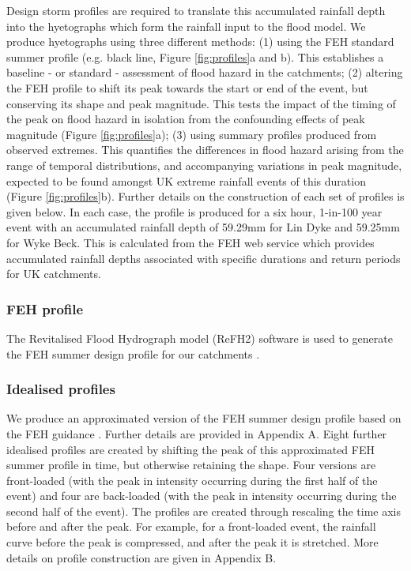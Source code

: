 \documentclass[APA,Times2COL]{WileyNJDv5}
\begin{document}
Design storm profiles are required to translate this accumulated rainfall depth into the hyetographs which form the rainfall input to the flood model. We produce hyetographs using three different methods: (1) using the FEH standard summer profile (e.g. black line, Figure \ref{fig:profiles}a and b). This establishes a baseline - or standard - assessment of flood hazard in the catchments; (2) altering the FEH profile to shift its peak towards the start or end of the event, but conserving its shape and peak magnitude. This tests the impact of the timing of the peak on flood hazard in isolation from the confounding effects of peak magnitude (Figure \ref{fig:profiles}a); (3) using summary profiles produced from observed extremes. This quantifies the differences in flood hazard arising from the range of temporal distributions, and accompanying variations in peak magnitude, expected to be found amongst UK extreme rainfall events of this duration (Figure \ref{fig:profiles}b). Further details on the construction of each set of profiles is given below. In each case, the profile is produced for a six hour, 1-in-100 year event with an accumulated rainfall depth of 59.29mm for Lin Dyke and 59.25mm for Wyke Beck. This is calculated from the FEH web service which provides accumulated rainfall depths associated with specific durations and return periods for UK catchments.

\subsubsection{FEH profile}\label{subsubsec:feh}
The Revitalised Flood Hydrograph model (ReFH2) software is used to generate the FEH summer design profile for our catchments \citep{kjeldsen2013modelling}.

\subsubsection{Idealised profiles}\label{subsubsec:idealised}
We produce an approximated version of the FEH summer design profile based on the FEH guidance \citep{kjeldsen2007revitalised}. Further details are provided in Appendix A. Eight further idealised profiles are created by shifting the peak of this approximated FEH summer profile in time, but otherwise retaining the shape. Four versions are front-loaded (with the peak in intensity occurring during the first half of the event) and four are back-loaded (with the peak in intensity occurring during the second half of the event). The profiles are created through rescaling the time axis before and after the peak. For example, for a front-loaded event, the rainfall curve before the peak is compressed, and after the peak it is stretched. More details on profile construction are given in Appendix B.
\end{document}
